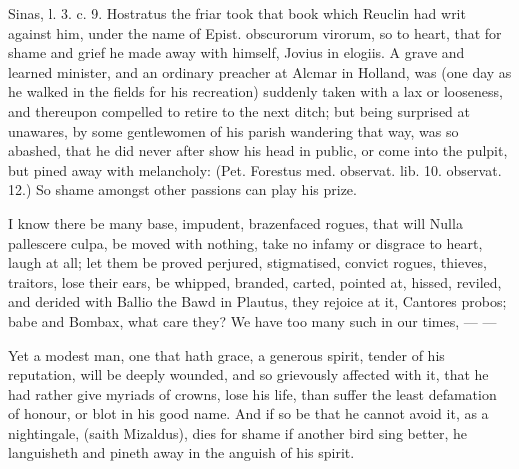 {Sinas, l. 3. c. 9. Hostratus the friar took that book which Reuclin had
writ against him, under the name of Epist. obscurorum virorum, so to
heart, that for shame and grief he made away with himself, Jovius
in elogiis. A grave and learned minister, and an ordinary preacher at
Alcmar in Holland, was (one day as he walked in the fields for his
recreation) suddenly taken with a lax or looseness, and thereupon
compelled to retire to the next ditch; but being surprised at
unawares, by some gentlewomen of his parish wandering that way, was so
abashed, that he did never after show his head in public, or come into
the pulpit, but pined away with melancholy: (Pet. Forestus med.
observat. lib. 10. observat. 12.) So shame amongst other passions can
play his prize.

I know there be many base, impudent, brazenfaced rogues, that will
 Nulla pallescere culpa, be moved with nothing, take no infamy or
disgrace to heart, laugh at all; let them be proved perjured,
stigmatised, convict rogues, thieves, traitors, lose their ears, be
whipped, branded, carted, pointed at, hissed, reviled, and derided with
Ballio the Bawd in Plautus, they rejoice at it, Cantores probos;
babe and Bombax, what care they? We have too many such in our times,
---
---

Yet a modest man, one that hath grace, a generous spirit, tender of his
reputation, will be deeply wounded, and so grievously affected with it,
that he had rather give myriads of crowns, lose his life, than suffer
the least defamation of honour, or blot in his good name. And if so be
that he cannot avoid it, as a nightingale, 
(saith Mizaldus), dies for shame if another bird sing better, he
languisheth and pineth away in the anguish of his spirit.

}
